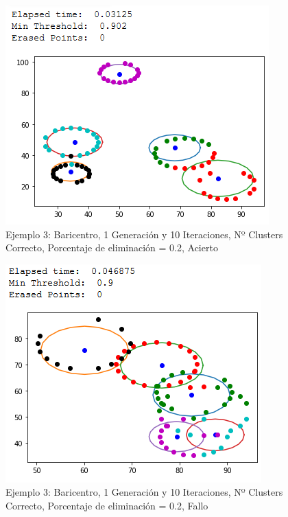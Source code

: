 \documentclass[conference,a4paper]{IEEEtran}
\begin{document}
\begin{figure}[H]
\centering
\includegraphics[scale=0.65]{Experimentacion/Ejemplo3/ej3_b_1_10_le_correct}
\caption{Ejemplo 3: Baricentro, 1 Generación y 10 Iteraciones,  Nº Clusters Correcto, Porcentaje de eliminación = 0.2, Acierto\\}
\end{figure}

\begin{figure}[H]
\centering
\includegraphics[scale=0.65]{Experimentacion/Ejemplo2/ej2_b_1_10_le_wrong}
\caption{Ejemplo 3: Baricentro, 1 Generación y 10 Iteraciones,  Nº Clusters Correcto, Porcentaje de eliminación = 0.2, Fallo\\}
\end{figure}
\end{document}
